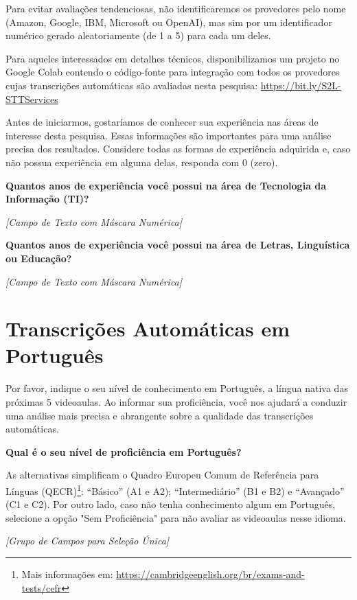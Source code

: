 \noindent
Para evitar avaliações tendenciosas, não identificaremos os provedores pelo nome 
(Amazon, Google, IBM, Microsoft ou OpenAI), mas sim por um identificador numérico 
gerado aleatoriamente (de 1 a 5) para cada um deles. 

\noindent
Para aqueles interessados em detalhes técnicos, disponibilizamos um projeto no Google Colab contendo o código-fonte para integração com todos os provedores cujas transcrições automáticas são avaliadas nesta pesquisa: \url{https://bit.ly/S2L-STTServices}

\noindent
Antes de iniciarmos, gostaríamos de conhecer sua experiência nas áreas de interesse 
desta pesquisa. Essas informações são importantes para uma análise precisa dos 
resultados. Considere todas as formas de experiência adquirida e, caso não possua 
experiência em alguma delas, responda com 0 (zero).

\noindent
\textbf{Quantos anos de experiência você possui na área de Tecnologia da Informação (TI)?}

\noindent
\textit{[Campo de Texto com Máscara Numérica]}

\noindent
\textbf{Quantos anos de experiência você possui na área de Letras, Linguística ou Educação?}

\noindent
\textit{[Campo de Texto com Máscara Numérica]}

\section{Transcrições Automáticas em Português}

\noindent
Por favor, indique o seu nível de conhecimento em Português, a língua nativa das 
próximas 5 videoaulas. Ao informar sua proficiência, você nos ajudará a conduzir uma 
análise mais precisa e abrangente sobre a qualidade das transcrições automáticas.

\noindent
\textbf{Qual é o seu nível de proficiência em Português?}

\noindent
As alternativas simplificam o Quadro Europeu Comum de Referência para Línguas (QECR)\footnote{Mais informações em: \url{https://cambridgeenglish.org/br/exams-and-tests/cefr}}: ``Básico'' (A1 e A2); ``Intermediário'' (B1 e B2) e ``Avançado'' (C1 e C2). Por outro lado, caso não tenha conhecimento algum em Português, selecione a opção "Sem Proficiência" para não avaliar as videoaulas nesse idioma.

\noindent
\textit{[Grupo de Campos para Seleção Única]}

